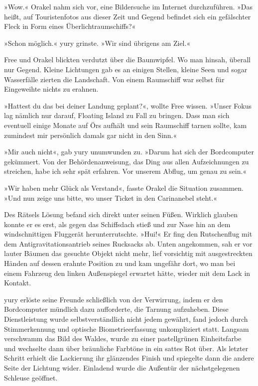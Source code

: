 »Wow.« Orakel nahm sich vor, eine Bildersuche im Internet durchzuführen. »Das heißt, auf Touristenfotos aus dieser Zeit und Gegend befindet sich ein gefälschter Fleck in Form eines Überlichtraumschiffs?«

»Schon möglich.« yury grinste. »Wir sind übrigens am Ziel.«

Free und Orakel blickten verdutzt über die Baumwipfel. Wo man hinsah, überall nur Gegend. Kleine Lichtungen gab es an einigen Stellen, kleine Seen und sogar Wasserfälle zierten die Landschaft. Von einem Raumschiff war selbst für Eingeweihte nichts zu erahnen.

»Hattest du das bei deiner Landung geplant?«, wollte Free wissen. »Unser Fokus lag nämlich nur darauf, Floating Island zu Fall zu bringen. Dass man sich eventuell einige Monate auf Örs aufhält und sein Raumschiff tarnen sollte, kam zumindest mir persönlich damals gar nicht in den Sinn.«

»Mir auch nicht«, gab yury unumwunden zu. »Darum hat sich der Bordcomputer gekümmert. Von der Behördenanweisung, das Ding aus allen Aufzeichnungen zu streichen, habe ich sehr spät erfahren. Vor unserem Abflug, um genau zu sein.«

»Wir haben mehr Glück als Verstand«, fasste Orakel die Situation zusammen. »Und nun zeige uns bitte, wo unser Ticket in den Carinanebel steht.«

Des Rätsels Lösung befand sich direkt unter seinen Füßen. Wirklich glauben konnte er es erst, als gegen das Schiffsdach stieß und zur Nase hin an dem windschnittigen Fluggerät herunterrutschte. »Hui!« Er fing den Rutschenflug mit dem Antigravitationsantrieb seines Rucksacks ab. Unten angekommen, sah er vor lauter Bäumen das gesuchte Objekt nicht mehr, lief vorsichtig mit ausgestreckten Händen auf dessen erahnte Position zu und kam ungefähr dort, wo man bei einem Fahrzeug den linken Außenspiegel erwartet hätte, wieder mit dem Lack in Kontakt.

yury erlöste seine Freunde schließlich von der Verwirrung, indem er den Bordcomputer mündlich dazu aufforderte, die Tarnung aufzuheben. Diese Dienstleistung wurde selbstverständlich nicht jedem gewährt, fand jedoch durch Stimmerkennung und optische Biometrieerfassung unkompliziert statt. Langsam verschwamm das Bild des Waldes, wurde zu einer pastellgrünen Einheitsfarbe und wechselte dann über bräunliche Farbtöne in ein sattes Rot über. Als letzter Schritt erhielt die Lackierung ihr glänzendes Finish und spiegelte dann die andere Seite der Lichtung wider. Einladend wurde die Außentür der nächstgelegenen Schleuse geöffnet.

